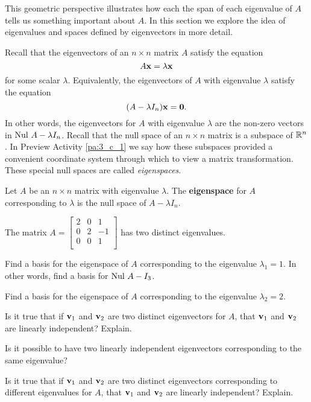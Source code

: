 This geometric perspective illustrates how each the span of each eigenvalue of $A$ tells us something important about $A$.  In this section we explore the idea of eigenvalues and spaces defined by eigenvectors in more detail.


Recall that the eigenvectors of an $n \times n$ matrix $A$ satisfy the equation 
\[A \mathbf{x} = \lambda \mathbf{x}\]
for some scalar $\lambda$. Equivalently, the eigenvectors of $A$ with eigenvalue $\lambda$ satisfy the equation 
\[(A - \lambda I_n) \mathbf{x} = \mathbf{0}.\]
In other words, the eigenvectors for $A$ with eigenvalue $\lambda$ are the non-zero vectors in $\text{Nul } A-\lambda I_n$. Recall that the null space of an $n \times n$ matrix is a subspace of $\mathbb{R}^n$. In Preview Activity \ref{pa:3_c_1} we say how these subspaces provided a convenient coordinate system through which to view a matrix transformation. These special null spaces are called \emph{eigenspaces}.



\begin{definition} Let $A$ be an $n \times n$ matrix with eigenvalue $\lambda$. The \textbf{eigenspace} for $A$ corresponding to $\lambda$ is the null space of $A - \lambda I_n$.
\end{definition}



\begin{activity} \label{act:3_c_1} The matrix $A = \left[ \begin{array}{rrrr} 2&0&1 \\ 0&2&-1 \\ 0&0&1 \\  \end{array} \right]$ has two distinct eigenvalues. 
	\ba
	\item Find a basis for the eigenspace of $A$ corresponding to the eigenvalue $\lambda_1 = 1$. In other words, find a basis for $\text{Nul } A - I_3$. 



	\item Find a basis for the eigenspace of $A$ corresponding to the eigenvalue $\lambda_2 = 2$. 



	\item Is it true that if $\mathbf{v}_1$ and $\mathbf{v}_2$ are two distinct eigenvectors for $A$, that $\mathbf{v}_1$ and $\mathbf{v}_2$ are linearly independent? Explain. 



	\item Is it possible to have two linearly independent eigenvectors corresponding to the same eigenvalue?
	
	
	

	\item Is it true that if $\mathbf{v}_1$ and $\mathbf{v}_2$ are two distinct eigenvectors corresponding to different eigenvalues for $A$, that $\mathbf{v}_1$ and $\mathbf{v}_2$ are linearly independent? Explain. 
	
	
	
	\ea
	
\end{activity}



